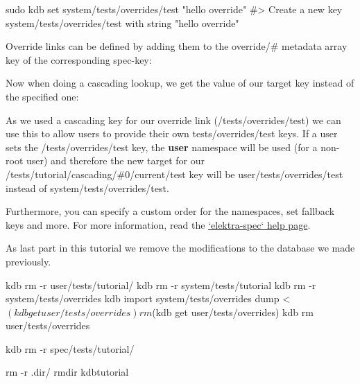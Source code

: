\begin{DoxyCode}
sudo kdb set system/tests/overrides/test "hello override"
#> Create a new key system/tests/overrides/test with string "hello override"
\end{DoxyCode}


Override links can be defined by adding them to the {\ttfamily override/\#} metadata array key of the corresponding {\ttfamily spec-\/key}\+:




Now when doing a cascading lookup, we get the value of our target key instead of the specified one\+:




As we used a cascading key for our override link ({\ttfamily /tests/overrides/test}) we can use this to allow users to provide their own {\ttfamily tests/overrides/test} keys. If a user sets the {\ttfamily /tests/overrides/test} key, the {\bfseries user} namespace will be used (for a non-\/root user) and therefore the new target for our {\ttfamily /tests/tutorial/cascading/\#0/current/test} key will be {\ttfamily user/tests/overrides/test} instead of {\ttfamily system/tests/overrides/test}.




Furthermore, you can specify a custom order for the namespaces, set fallback keys and more. For more information, read the \hyperlink{doc_help_elektra-spec_md}{`elektra-\/spec` help page}.

As last part in this tutorial we remove the modifications to the database we made previously.


\begin{DoxyCode}
kdb rm -r user/tests/tutorial/
kdb rm -r system/tests/tutorial
kdb rm -r system/tests/overrides
kdb import system/tests/overrides dump < $(kdb get user/tests/overrides)
rm $(kdb get user/tests/overrides)
kdb rm user/tests/overrides

kdb rm -r spec/tests/tutorial/

rm -r .dir/
rmdir kdbtutorial
\end{DoxyCode}
 